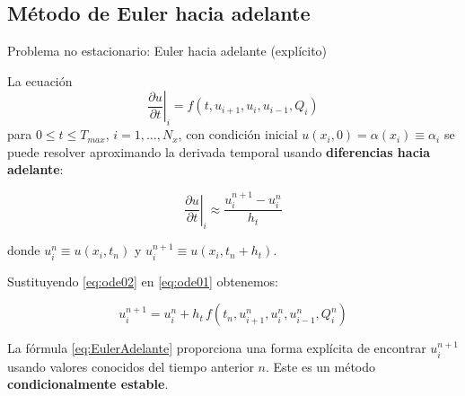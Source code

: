\documentclass{beamer}
\begin{document}
\subsection{Método de Euler hacia adelante}

\begin{frame}
\begin{center}
\end{center}
\end{frame}

\begin{frame}{Problema no estacionario: Euler hacia adelante (expl\'icito)}

{\small La ecuación
%
\begin{equation}\label{eq:ode01}
\left.\frac{\partial u}{\partial t}\right|_i = f(t, u_{i+1}, u_{i}, u_{i-1}, Q_i)
\end{equation}
%
para $0 \leq t \leq T_{max}$, $i = 1, \dots, N_x$, con condici\'on inicial $u(x_i, 0) = \alpha(x_i) \equiv \alpha_i$ se puede resolver aproximando la derivada temporal usando \textbf{diferencias hacia adelante}:

\begin{equation}\label{eq:ode02}
\left.\frac{\partial u}{\partial t}\right|_i  \approx \frac{u_{i}^{n+1} - u_{i}^{n}}{h_t}
\end{equation}

donde $u_{i}^{n} \equiv u(x_i, t_n)$ y $u_{i}^{n+1} \equiv u(x_i, t_n + h_t)$.

\strut

Sustituyendo \eqref{eq:ode02} en \eqref{eq:ode01} obtenemos:

\begin{equation}\label{eq:EulerAdelante}
\boxed{u_{i}^{n+1} = u_{i}^{n} + h_t \, f(t_n, u_{i+1}^{n}, u_{i}^{n}, u_{i-1}^{n}, Q_i^n)}
\end{equation}

La fórmula \eqref{eq:EulerAdelante} proporciona una forma explícita de encontrar $u_i^{n+1}$ usando valores conocidos del tiempo anterior $n$.
Este es un método \textbf{condicionalmente estable}.

}
\end{frame}

\begin{frame}
\begin{center}
\end{center}
\end{frame}
\end{document}
